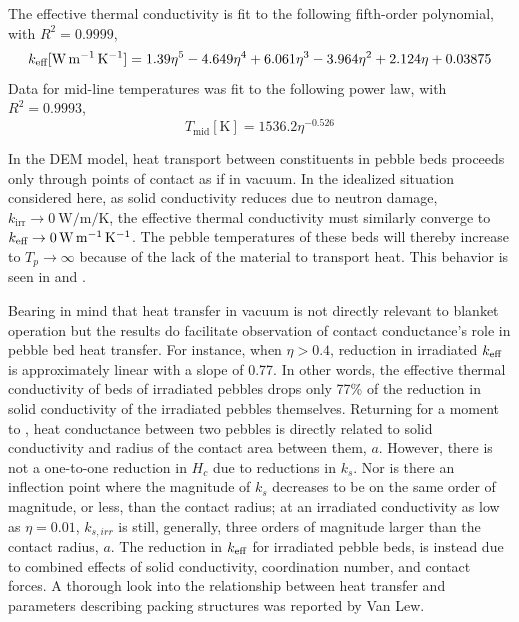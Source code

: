 The effective thermal conductivity is fit to the following fifth-order polynomial, with $R^2 = 0.9999$,
\begin{equation}
k_\text{eff} [\si{\watt\per\meter\per\kelvin}] = 1.39 \eta^5 - 4.649 \eta^4 + 6.061 \eta^3 - 3.964 \eta^2 + 2.124 \eta + 0.03875
\end{equation}
Data for mid-line temperatures was fit to the following power law, with $R^2 = 0.9993$,
\begin{equation}
T_\text{mid}[\si{\kelvin}] = 1536.2\eta^{-0.526}
\end{equation}

In the DEM model, heat transport between constituents in pebble beds proceeds only through points of contact as if in vacuum. In the idealized situation considered here, as solid conductivity reduces due to neutron damage, $k_\text{irr} \rightarrow \SI{0}{\watt\per\meter\per\kelvin}$, the effective thermal conductivity must similarly converge to $k_\text{eff} \rightarrow \SI{0}{\watt\per\meter\per\kelvin}$. The pebble temperatures of these beds will thereby increase to $T_p \rightarrow \infty$ because of the lack of the material to transport heat. This behavior is seen in  and .

Bearing in mind that heat transfer in vacuum is not directly relevant to blanket operation but the results do facilitate observation of contact conductance's role in pebble bed heat transfer. For instance, when $\eta > 0.4$, reduction in irradiated $k_\text{eff}$ is approximately linear with a slope of \num{0.77}. In other words, the effective thermal conductivity of beds of irradiated pebbles drops only 77\% of the reduction in solid conductivity of the irradiated pebbles themselves. Returning for a moment to , heat conductance between two pebbles is directly related to solid conductivity and radius of the contact area between them, $a$. However, there is not a one-to-one reduction in $H_c$ due to reductions in $k_s$. Nor is there an inflection point where the magnitude of $k_s$ decreases to be on the same order of magnitude, or less, than the contact radius; at an irradiated conductivity as low as $\eta = 0.01$, $k_{s,irr}$ is still, generally, three orders of magnitude larger than the contact radius, $a$. The reduction in $k_\text{eff}$ for irradiated pebble beds, is instead due to combined effects of solid conductivity, coordination number, and contact forces. A thorough look into the relationship between heat transfer and parameters describing packing structures was reported by Van Lew\etal.\cite{VanLew2014}

